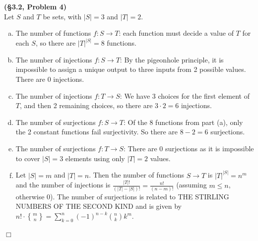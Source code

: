 \documentclass[12pt]{article}
\theoremstyle{definition}
\newenvironment{Solution}{\noindent {\sc Solution.}}{$\Box$ \vspace{2 ex}}
\begin{document}
\vspace{1cm}

\begin{Solution}
{\bf (\S3.2, Problem 4)}\\
Let $S$ and $T$ be sets, with $|S|=3$ and $|T|=2$.
\begin{enumerate}[(a)]
    \item The number of functions $f : S \to T$: each function must decide a value of $T$ for each $S$, so there are $|T|^{|S|}= 8$ functions.
    \item The number of injections $f : S \to T$: By the pigeonhole principle, it is impossible to assign a unique output to three inputs from 2 possible values. There are 0 injections.
    \item The number of injections $f : T \to S$: We have 3 choices for the first element of $T$, and then 2 remaining choices, so there are $3\cdot 2 = 6$ injections.
    \item The number of surjections $f : S\to T$: Of the 8 functions from part (a), only the 2 constant functions fail surjectivity. So there are $8-2=6$ surjections.
    \item The number of surjections $f : T\to S$: There are 0 surjections as it is impossible to cover $|S|=3$ elements using only $|T|=2$ values.
    \item Let $|S|=m$ and $|T|=n$. Then the number of functions $S\to T$ is $|T|^{|S|} = n^m$ and the number of injections is $\frac{|T|!}{(|T|-|S|)!} = \frac{n!}{(n-m)!}$ (assuming $m \le n$, otherwise 0). The number of surjections is related to THE STIRLING NUMBERS OF THE SECOND KIND and is given by $n!\cdot\genfrac{\{}{\}}{0pt}{}{m}{n} = \sum_{k=0}^n (-1)^{n-k}\binom{n}{k} k^m$.
\end{enumerate}
\end{Solution}

\vspace{0.5cm}
\end{document}
